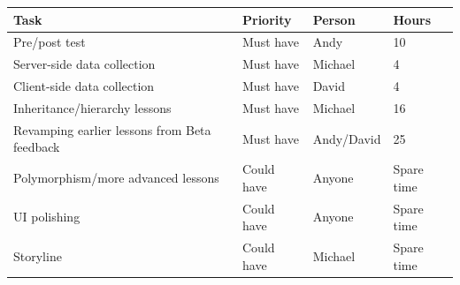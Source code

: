 \documentclass[12pt,notitlepage]{article}
\begin{document}
\begin{tabu}{Xlll}
\toprule
Task & Priority & Person & Hours \\
\midrule
Pre/post test & Must have & Andy & 10 \\
Server-side data collection & Must have & Michael & 4 \\
Client-side data collection & Must have & David & 4 \\
Inheritance/hierarchy lessons & Must have & Michael & 16 \\
Revamping earlier lessons from Beta feedback & Must have & Andy/David & 25 \\
Polymorphism/more advanced lessons & Could have & Anyone & Spare time \\
UI polishing & Could have & Anyone & Spare time \\
Storyline & Could have & Michael & Spare time \\
\bottomrule
\end{tabu}
\end{document}
